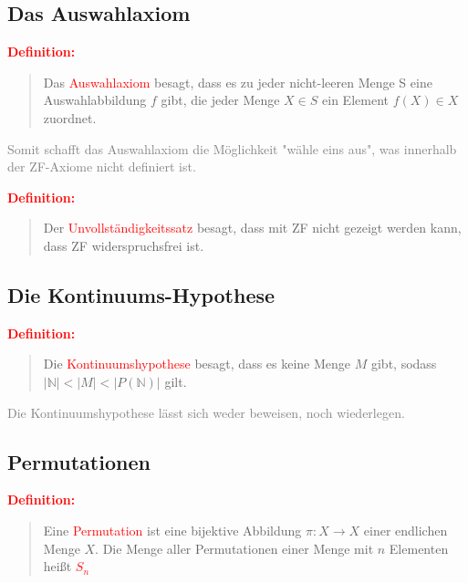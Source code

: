 \documentclass{article}
\newcommand{\red}[1]{\textcolor{red}{#1}}
\newcommand{\gray}[1]{\textcolor{gray}{#1}}
\newcommand{\de}[1]{\red{\textbf{Definition: }}\begin{quote}#1\end{quote}}
\newcommand{\N}{\mathbb{N}}
\begin{document}
\subsection{Das Auswahlaxiom}

\de{Das \red{Auswahlaxiom} besagt, dass es zu jeder nicht-leeren Menge S eine Auswahlabbildung $f$ gibt, die jeder Menge $X \in S$ ein Element $f(X) \in X$ zuordnet.}
\gray{Somit schafft das Auswahlaxiom die Möglichkeit "wähle eins aus", was innerhalb der ZF-Axiome nicht definiert ist.}

\de{Der \red{Unvollständigkeitssatz} besagt, dass mit ZF nicht gezeigt werden kann, dass ZF widerspruchsfrei ist.}

\subsection{Die Kontinuums-Hypothese}

\de{Die \red{Kontinuumshypothese} besagt, dass es keine Menge $M$ gibt, sodass $|\N| < |M| < |P(\N)|$ gilt.}
\gray{Die Kontinuumshypothese lässt sich weder beweisen, noch wiederlegen.}

\subsection{Permutationen}

\de{Eine \red{Permutation} ist eine bijektive Abbildung $\pi: X \to X$ einer endlichen Menge $X$. Die Menge aller Permutationen einer Menge mit $n$ Elementen heißt \red{$S_n$}}
\end{document}
